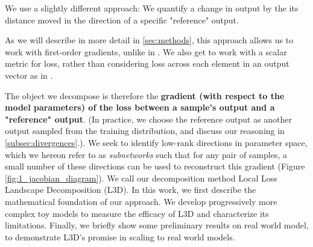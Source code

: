 \documentclass{article}
\theoremstyle{plain}
\theoremstyle{definition}
\theoremstyle{remark}
\begin{document}
We use a slightly different approach: We quantify a change in output by the its distance moved in the direction of a specific "reference" output.

As we will describe in more detail in \ref{sec:methods}, this approach allows us to work with first-order gradients, unlike in \cite{matena2023npeff}.  We also get to work with a scalar metric for loss, rather than considering loss across each element in an output vector as in \cite{braun2025interpretability}.

The object we decompose is therefore the \textbf{gradient (with respect to the model parameters) of the loss between a sample's output and a "reference" output}. (In practice, we choose the reference output as another output sampled from the training distribution, and discuss our reasoning in \ref{subsec:divergences}.). We seek to identify low-rank directions in parameter space, which we hereon refer to as \textit{subnetworks} such that for any pair of samples, a small number of these directions can be used to reconstruct this gradient (Figure \ref{fig:1_jacobian_diagram}). We call our decomposition method Local Loss Landscape Decomposition (L3D). In this work, we first describe the mathematical foundation of our approach. We develop progressively more complex toy models to measure the efficacy of L3D and characterize its limitations.  Finally, we briefly show some preliminary results on real world model, to demonstrate L3D's promise in scaling to real world models.



\end{document}
